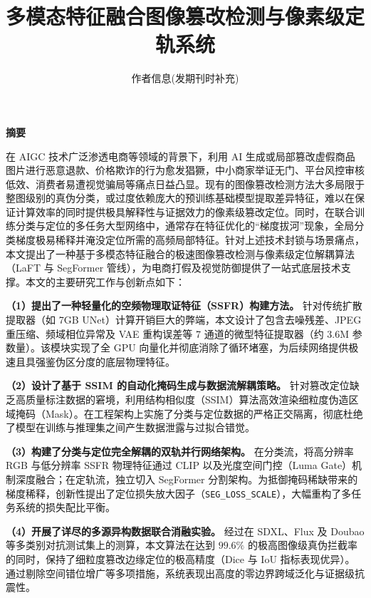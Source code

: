 \documentclass[10pt,a4paper,twocolumn]{ctexart}
\title{多模态特征融合图像篡改检测与像素级定轨系统}
\author{作者信息(发期刊时补充)}
\date{}
\begin{document}
\maketitle


\begin{center}
    \bfseries {} 摘\quad 要
\end{center}



在 AIGC 技术广泛渗透电商等领域的背景下，利用 AI 生成或局部篡改虚假商品图片进行恶意退款、价格欺诈的行为愈发猖獗，中小商家举证无门、平台风控审核低效、消费者易遭视觉骗局等痛点日益凸显。现有的图像篡改检测方法大多局限于整图级别的真伪分类，或过度依赖庞大的预训练基础模型提取差异特征，难以在保证计算效率的同时提供极具解释性与证据效力的像素级篡改定位。同时，在联合训练分类与定位的多任务大型网络中，通常存在特征优化的“梯度拔河”现象，全局分类梯度极易稀释并淹没定位所需的高频局部特征。针对上述技术封锁与场景痛点，本文提出了一种基于多模态特征融合的极速图像篡改检测与像素级定位解耦算法（LaFT 与 SegFormer 管线），为电商打假及视觉防御提供了一站式底层技术支撑。本文的主要研究工作与创新点如下：

\textbf{（1）提出了一种轻量化的空频物理取证特征（SSFR）构建方法。} 针对传统扩散提取器（如 7GB UNet）计算开销巨大的弊端，本文设计了包含去噪残差、JPEG重压缩、频域相位异常及 VAE 重构误差等 7 通道的微型特征提取器（约 3.6M 参数量）。该模块实现了全 GPU 向量化并彻底消除了循环堵塞，为后续网络提供极速且具强鉴伪区分度的底层物理特征。

\textbf{（2）设计了基于 SSIM 的自动化掩码生成与数据流解耦策略。} 针对篡改定位缺乏高质量标注数据的窘境，利用结构相似度（SSIM）算法高效渲染细粒度伪造区域掩码（Mask）。在工程架构上实施了分类与定位数据的严格正交隔离，彻底杜绝了模型在训练与推理集之间产生数据泄露与过拟合错觉。

\textbf{（3）构建了分类与定位完全解耦的双轨并行网络架构。} 在分类流，将高分辨率 RGB 与低分辨率 SSFR 物理特征通过 CLIP 以及光度空间门控（Luma Gate）机制深度融合；在定轨流，独立切入 SegFormer 分割架构。为抵御掩码稀缺带来的梯度稀释，创新性提出了定位损失放大因子（\texttt{SEG\_LOSS\_SCALE}），大幅重构了多任务系统的损失配比平衡。

\textbf{（4）开展了详尽的多源异构数据联合消融实验。} 经过在 SDXL、Flux 及 Doubao 等多类别对抗测试集上的测算，本文算法在达到 $99.6\%$ 的极高图像级真伪拦截率的同时，保持了细粒度篡改边缘定位的极高精度（Dice 与 IoU 指标表现优异）。通过剔除空间错位增广等多项措施，系统表现出高度的零边界跨域泛化与证据级抗震性。

\vspace{1ex}
\noindent
\end{document}
